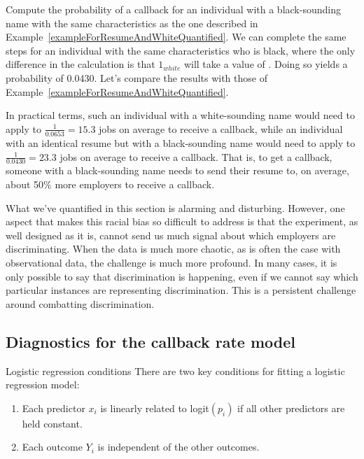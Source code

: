 \begin{examplewrap}
\begin{nexample}{Compute the probability of a callback
    for an individual with a black-sounding name
    with the same characteristics as the one described
    in Example~\ref{exampleForResumeAndWhiteQuantified}.}
  We can complete the same steps for an individual
  with the same characteristics who is black,
  where the only difference in the calculation is that
  $1_{white}$ will take a value of .
  Doing so yields a probability of 0.0430.
  Let's compare the results with those of
  Example~\ref{exampleForResumeAndWhiteQuantified}.

  In practical terms, such an individual with
  a white-sounding name would need to apply to
  $\frac{1}{0.0653} = 15.3$ jobs on average to receive
  a callback,
  while an individual with an identical resume but with
  a black-sounding name would need to apply to
  $\frac{1}{0.0430} = 23.3$ jobs on average to receive
  a callback.
  That is, to get a callback, someone with a
  black-sounding name needs to send their resume to,
  on average,
  about 50\% more employers to receive a callback.
\end{nexample}
\end{examplewrap}

What we've quantified in this section is alarming and disturbing.
However, one aspect that makes this racial bias so difficult to
address is that the experiment, as well designed as it is,
cannot send us much signal about which employers are
discriminating.
When the data is much more chaotic, as is often the case
with observational data, the challenge is much more profound.
In many cases, it is only possible to say that discrimination
is happening, even if we cannot say which particular instances
are representing discrimination.
This is a persistent challenge around combatting discrimination.



\subsection{Diagnostics for the callback rate model}

\begin{onebox}{Logistic regression conditions}
There are two key conditions for fitting a logistic regression model:
\begin{enumerate}
\setlength{\itemsep}{0mm}
\item Each predictor $x_i$ is linearly related to logit$(p_i)$ if all other predictors are held constant.
\item Each outcome $Y_i$ is independent of the other outcomes.
\end{enumerate}
\end{onebox}


